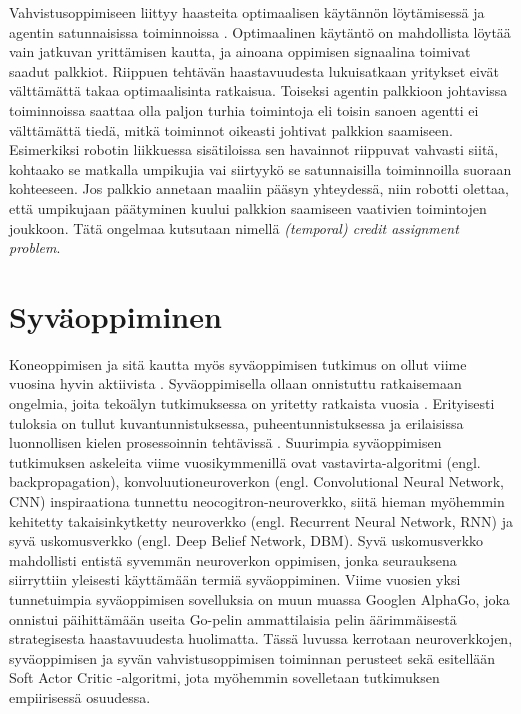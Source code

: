 \documentclass[utf8]{gradu3}
\begin{document}
Vahvistusoppimiseen liittyy haasteita optimaalisen käytännön löytämisessä ja agentin satunnaisissa toiminnoissa \parencite{arulkumaran2017brief}. Optimaalinen käytäntö on mahdollista löytää vain jatkuvan yrittämisen kautta, ja ainoana oppimisen signaalina toimivat saadut palkkiot. Riippuen tehtävän haastavuudesta lukuisatkaan yritykset eivät välttämättä takaa optimaalisinta ratkaisua. Toiseksi agentin palkkioon johtavissa toiminnoissa saattaa olla paljon turhia toimintoja eli toisin sanoen agentti ei välttämättä tiedä, mitkä toiminnot oikeasti johtivat palkkion saamiseen. Esimerkiksi robotin liikkuessa sisätiloissa sen havainnot riippuvat vahvasti siitä, kohtaako se matkalla umpikujia vai siirtyykö se satunnaisilla toiminnoilla suoraan kohteeseen. Jos palkkio annetaan maaliin pääsyn yhteydessä, niin robotti olettaa, että umpikujaan päätyminen kuului palkkion saamiseen vaativien toimintojen joukkoon. Tätä ongelmaa kutsutaan nimellä \textit{(temporal) credit assignment problem}.

\section{Syväoppiminen}

Koneoppimisen ja sitä kautta myös syväoppimisen tutkimus on ollut viime vuosina hyvin aktiivista \parencite{pouyanfar2018survey}. Syväoppimisella ollaan onnistuttu ratkaisemaan ongelmia, joita tekoälyn tutkimuksessa on yritetty ratkaista vuosia \parencite{lecun2015deep,pouyanfar2018survey}. Erityisesti tuloksia on tullut kuvantunnistuksessa, puheentunnistuksessa ja erilaisissa luonnollisen kielen prosessoinnin tehtävissä \parencite{lecun2015deep,pouyanfar2018survey}. Suurimpia syväoppimisen tutkimuksen askeleita viime vuosikymmenillä ovat vastavirta-algoritmi (engl. backpropagation), konvoluutioneuroverkon (engl. Convolutional Neural Network, CNN) inspiraationa tunnettu neocogitron-neuroverkko, siitä hieman myöhemmin kehitetty takaisinkytketty neuroverkko (engl. Recurrent Neural Network, RNN) ja syvä uskomusverkko (engl. Deep Belief Network, DBM). Syvä uskomusverkko mahdollisti entistä syvemmän neuroverkon oppimisen, jonka seurauksena siirryttiin yleisesti käyttämään termiä syväoppiminen. Viime vuosien yksi tunnetuimpia syväoppimisen sovelluksia on muun muassa Googlen AlphaGo, joka onnistui päihittämään useita Go-pelin ammattilaisia pelin äärimmäisestä strategisesta haastavuudesta huolimatta. Tässä luvussa kerrotaan neuroverkkojen, syväoppimisen ja syvän vahvistusoppimisen toiminnan perusteet sekä esitellään Soft Actor Critic -algoritmi, jota myöhemmin sovelletaan tutkimuksen empiirisessä osuudessa.
\end{document}

